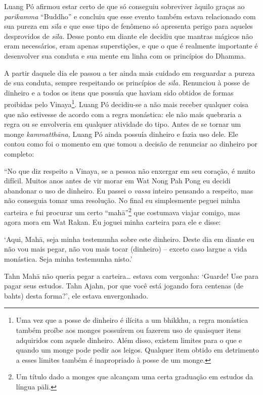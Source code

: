Luang Pó afirmou estar certo de que só conseguiu sobreviver àquilo
graças ao \emph{parikamma} ``Buddho'' e concluiu que esse evento também
estava relacionado com sua pureza em \emph{sīla} e que esse tipo de
fenômeno só apresenta perigo para aqueles desprovidos de \emph{sīla.}
Desse ponto em diante ele decidiu que mantras mágicos não eram
necessários, eram apenas superstições, e que o que é realmente
importante é desenvolver sua conduta e sua mente em linha com os
princípios do Dhamma.

A partir daquele dia ele passou a ter ainda mais cuidado em resguardar a
pureza de sua conduta, sempre respeitando os princípios de \emph{sīla.}
Renunciou à posse de dinheiro e a todos os itens que possuía que haviam
sido obtidos de formas proibidas pelo Vinaya\footnote{Uma vez que a
  posse de dinheiro é ilícita a um bhikkhu, a regra monástica também
  proíbe aos monges possuírem ou fazerem uso de quaisquer itens
  adquiridos com aquele dinheiro. Além disso, existem limites para o que
  e quando um monge pode pedir aos leigos. Qualquer item obtido em
  detrimento a esses limites também é inapropriado à posse de um monge.}.
Luang Pó decidiu-se a não mais receber qualquer coisa que não estivesse
de acordo com a regra monástica: ele não mais quebraria a regra ou se
envolveria em qualquer atividade do tipo. Antes de se tornar um monge
\emph{kammatthāna,} Luang Pó ainda possuía dinheiro e fazia uso dele.
Ele contou como foi o momento em que tomou a decisão de renunciar ao
dinheiro por completo:

``No que diz respeito a Vinaya, se a pessoa não enxergar em seu coração,
é muito difícil. Muitos anos antes de vir morar em Wat Nong Pah Pong eu
decidi abandonar o uso de dinheiro. Eu passei o \emph{vassa} inteiro
pensando a respeito, mas não conseguia tomar uma resolução. No final eu
simplesmente peguei minha carteira e fui procurar um certo
``mahā''\footnote{Um título dado a monges que alcançam uma certa
  graduação em estudos da língua pāli.} que costumava viajar comigo, mas
agora mora em Wat Rakan. Eu joguei minha carteira para ele e disse:

`Aqui, Mahā, seja minha testemunha sobre este dinheiro. Deste dia em
diante eu não vou mais pegar, não vou mais tocar (dinheiro) -- exceto
caso largue a vida monástica. Seja minha testemunha nisto.'

Tahn Mahā não queria pegar a carteira\ldots{} estava com vergonha:
`Guarde! Use para pagar seus estudos. Tahn Ajahn, por que você está
jogando fora centenas (de bahts) desta forma?', ele estava envergonhado.

